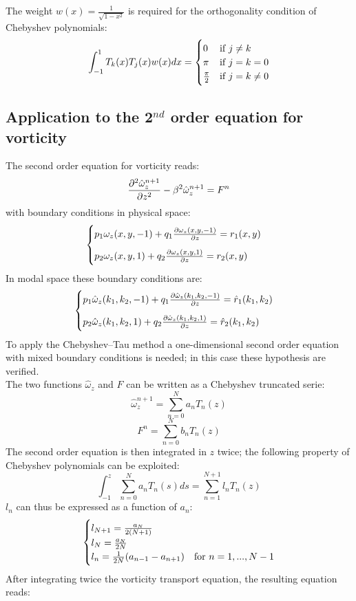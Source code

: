 The weight $w(x)=\frac{1}{\sqrt{1-x^2}}$ is required for the orthogonality condition of Chebyshev polynomials:
\[
\int_{-1}^1 T_k(x)T_j(x)w(x)dx=
\begin{cases}
0 &\textnormal{if } j\neq k\\
\pi & \textnormal{if } j=k=0\\
\frac{\pi}{2} & \textnormal{if } j=k\neq0
\end{cases}
\]

\subsection{Application to the 2$^{nd}$ order equation for vorticity}
The second order equation for vorticity reads:
\[
\frac{\partial^2 \hat\omega_z^{n+1}}{\partial z^2}-\beta^2\hat\omega_z^{n+1}=F^n
\]
with boundary conditions in physical space:
\[
\begin{cases}
p_1\omega_z(x,y,-1)+q_1\frac{\partial \omega_z(x,y,-1)}{\partial z}=r_1(x,y)\\[2ex]
p_2\omega_z(x,y,1)+q_2\frac{\partial \omega_z(x,y,1)}{\partial z}=r_2(x,y)\\
\end{cases}
\]
In modal space these boundary conditions are:
\[
\begin{cases}
p_1\hat\omega_z(k_1,k_2,-1)+q_1\frac{\partial \hat\omega_z(k_1,k_2,-1)}{\partial z}=\hat r_1(k_1,k_2)\\[2ex]
p_2\hat\omega_z(k_1,k_2,1)+q_2\frac{\partial \hat\omega_z(k_1,k_2,1)}{\partial z}=\hat r_2(k_1,k_2)\\
\end{cases}
\]
To apply the Chebyshev--Tau method a one-dimensional second order equation with mixed boundary conditions is needed; in this case these hypothesis are verified.\\
The two functions $\hat\omega_z$ and $F$ can be written as a Chebyshev truncated serie:
\[
\hat\omega_z^{n+1}=\sum_{n=0}^N a_nT_n(z)
\]
\[
F^n=\sum_{n=0}^N b_n T_n(z)
\]
The second order equation is then integrated in $z$ twice; the following property of Chebyshev polynomials can be exploited:
\[
\int_{-1}^z\sum_{n=0}^N a_nT_n(s)ds=\sum_{n=1}^{N+1}l_n T_n(z)
\]
$l_n$ can thus be expressed as a function of $a_n$:
\[
\begin{cases}
l_{N+1}=\frac{a_N}{2(N+1)}\\
l_N=\frac{a_{N}}{2N}\\
l_n=\frac{1}{2N}(a_{n-1}-a_{n+1}) &\textnormal{for } n=1,...,N-1
\end{cases}
\]
After integrating twice the vorticity transport equation, the resulting equation reads:
